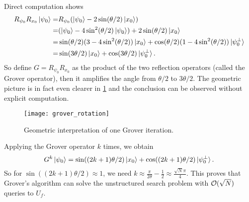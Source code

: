 Direct computation shows 
\begin{equation}
\begin{split}
R_{\psi_0}R_{x_0}\ket{\psi_0}=&R_{\psi_0}(\ket{\psi_0}-2\sin(\theta/2)\ket{x_0})\\
=&(\ket{\psi_0}-4\sin^2(\theta/2)\ket{\psi_0})+2\sin(\theta/2)\ket{x_0}\\
=&\sin (\theta/2) (3-4\sin^2 (\theta/2))\ket{x_0}+ 
\cos (\theta/2)(1-4\sin^2 (\theta/2))\ket{\psi_0^{\perp}}\\
=& \sin(3\theta/2)\ket{x_0}+\cos(3\theta/2)\ket{\psi_0^{\perp}}.
\end{split}
\end{equation}
So define $G=R_{\psi_0}R_{x_0}$ as the product of the two reflection operators (called the Grover operator), then it amplifies the angle from $\theta/2$ to $3\theta/2$.
The geometric picture is in fact even clearer in \cref{fig:grover_rotation} and the conclusion can be observed without explicit computation.

\begin{figure}[H]
\begin{center}
\texttt{[image: grover\_rotation]}
\end{center}
\caption{Geometric interpretation of one Grover iteration.}
\label{fig:grover_rotation}
\end{figure}

Applying the Grover operator $k$ times, we obtain 
\begin{equation}\label{eqn:grover_k}
G^k \ket{\psi_0}=\sin((2k+1)\theta/2)\ket{x_0}+\cos((2k+1)\theta/2)\ket{\psi_0^{\perp}}.
\end{equation}
So for $\sin((2k+1)\theta/2)\approx 1$, we need $k\approx \frac{\pi}{2\theta}-\frac{1}{2}\approx \frac{\sqrt{N}\pi}{4}$.
This proves that Grover's algorithm can solve the unstructured search problem with $\mathcal{O}(\sqrt{N})$ queries to $U_f$.


